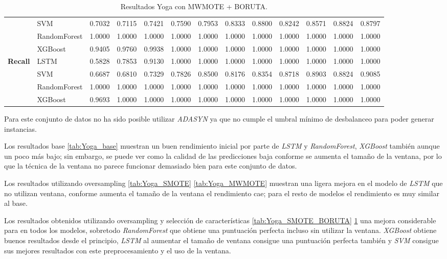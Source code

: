 \begin{table}[h]
\begin{adjustbox}{max width=15cm}
\begin{tabular}{|c|l|r|r|r|r|r|r|r|r|r|r|r|}
			& SVM &  0.7032 &  0.7115 &  0.7421 &  0.7590 &  0.7953 &  0.8333 &  0.8800 &  0.8242 &  0.8571 &  0.8824 &  0.8797 \\
			& RandomForest &  1.0000 &  1.0000 &  1.0000 &  1.0000 &  1.0000 &  1.0000 &  1.0000 &  1.0000 &  1.0000 &  1.0000 &  1.0000 \\
			& XGBoost &  0.9405 &  0.9760 &  0.9938 &  1.0000 &  1.0000 &  1.0000 &  1.0000 &  1.0000 &  1.0000 &  1.0000 &  1.0000 \\
			\hline
			\textbf{Recall} & LSTM &  0.5828 &  0.7853 &  0.9130 &  1.0000 &  1.0000 &  1.0000 &  1.0000 &  1.0000 &  1.0000 &  1.0000 &  1.0000 \\
			& SVM &  0.6687 &  0.6810 &  0.7329 &  0.7826 &  0.8500 &  0.8176 &  0.8354 &  0.8718 &  0.8903 &  0.8824 &  0.9085 \\
			& RandomForest &  1.0000 &  1.0000 &  1.0000 &  1.0000 &  1.0000 &  1.0000 &  1.0000 &  1.0000 &  1.0000 &  1.0000 &  1.0000 \\
			& XGBoost &  0.9693 &  1.0000 &  1.0000 &  1.0000 &  1.0000 &  1.0000 &  1.0000 &  1.0000 &  1.0000 &  1.0000 &  1.0000 \\
			\hline
		\end{tabular}
	\end{adjustbox}
	\caption{Resultados Yoga con MWMOTE + BORUTA.}
	\label{tab:Yoga_MWMOTE_BORUTA}
\end{table}
\newpage
Para este conjunto de datos no ha sido posible utilizar \textit{ADASYN} ya que no cumple el umbral mínimo de desbalanceo para poder generar instancias.\newline

Los resultados base \ref{tab:Yoga_base} muestran un buen rendimiento inicial por parte de \textit{LSTM} y \textit{RandomForest}, \textit{XGBoost} también aunque un poco más bajo; sin embargo, se puede ver como la calidad de las predicciones baja conforme se aumenta el tamaño de la ventana, por lo que la técnica de la ventana no parece funcionar demasiado bien para este conjunto de datos.\newline

Los resultados utilizando oversampling \ref{tab:Yoga_SMOTE} \ref{tab:Yoga_MWMOTE} muestran una ligera mejora en el modelo de \textit{LSTM} que no utilizan ventana, conforme aumenta el tamaño de la ventana el rendimiento cae; para el resto de modelos el rendimiento es muy similar al base.\newline

Los resultados obtenidos utilizando oversampling y selección de características \ref{tab:Yoga_SMOTE_BORUTA} \ref{tab:Yoga_MWMOTE_BORUTA} una mejora considerable para en todos los modelos, sobretodo \textit{RandomForest} que obtiene una puntuación perfecta incluso sin utilizar la ventana. \textit{XGBoost} obtiene buenos resultados desde el principio, \textit{LSTM} al aumentar el tamaño de ventana consigue una puntuación perfecta también y \textit{SVM} consigue sus mejores resultados con este preprocesamiento y el uso de la ventana.

